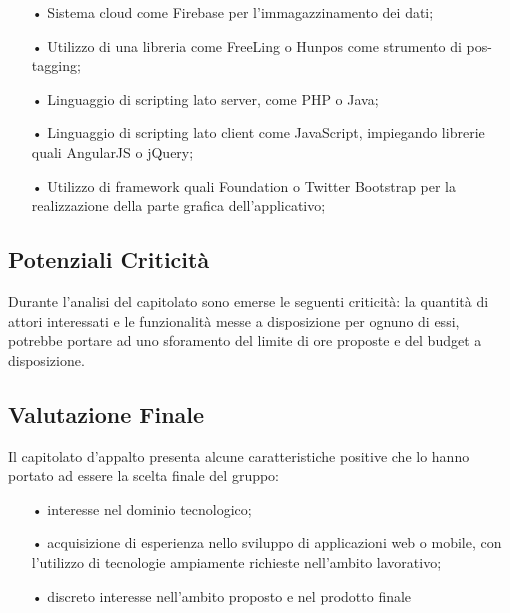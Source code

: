 \begin{itemize}
\item[•] Sistema cloud come Firebase per l'immagazzinamento dei dati;

\item[•] Utilizzo di una libreria come FreeLing o Hunpos come strumento di pos-tagging;

\item[•] Linguaggio di scripting lato server, come PHP o Java;

\item[•] Linguaggio di scripting lato client come JavaScript, impiegando librerie quali AngularJS o jQuery;

\item[•] Utilizzo di framework quali Foundation o Twitter Bootstrap per la realizzazione della parte grafica dell’applicativo;

\end{itemize}

\subsection{Potenziali Criticità}
Durante l’analisi del capitolato sono emerse le seguenti criticità:
la quantità di attori interessati e le funzionalità messe a disposizione per ognuno di essi, potrebbe portare ad uno sforamento del limite di ore proposte e del budget a disposizione.

\subsection{Valutazione Finale}
Il capitolato d’appalto presenta alcune caratteristiche positive che lo hanno portato ad essere
la scelta finale del gruppo:
\begin{itemize}
\item[•] interesse nel dominio tecnologico;
\item[•] acquisizione di esperienza nello sviluppo di applicazioni web o mobile, con l’utilizzo di tecnologie
ampiamente richieste nell’ambito lavorativo;
\item[•] discreto interesse nell'ambito proposto e nel prodotto finale 

\end{itemize}

